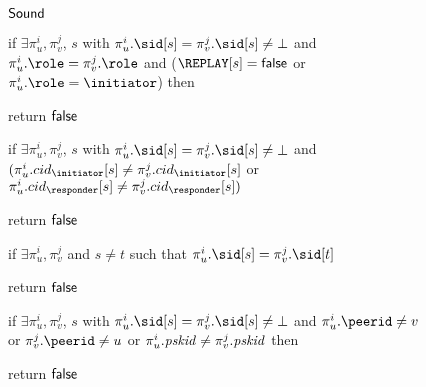 \begin{figure}[tp]
\begin{minipage}[t]{0.49\textwidth}
\begin{algorithm}{$\mathsf{Sound}$}
		\item if $\exists \pi_u^i, \pi_v^j$, $s$ with \newline
		\null\hindent 
		$\pi_u^i.\sid[s] = \pi_v^j.\sid[s] \neq \bot$ and \newline
		\null\hindent $\pi_u^i.\role = \pi_v^j.\role$ and \newline
		\null\hindent ($\REPLAY[s] = \false$ or $\pi_u^i.\role = \initiator$) then 
		\item \hindent return $\mathsf{false}$
		\newline {}
		
		\item if $\exists \pi_u^i, \pi_v^j$, $s$ with \newline
		\null \hindent
		$\pi_u^i.\sid[s] = \pi_v^j.\sid[s] \neq \bot$ and \newline $(\pi_u^i.\initcid[s] \neq \pi_v^j.\initcid[s]$ or $\pi_u^i.\respcid[s] \neq \pi_v^j.\respcid[s])$
		\item \hindent return $\mathsf{false}$
		\newline {}
		
		if $\exists \pi_u^i, \pi_v^j$ and $s \neq t$ such that
		\newline
		\null \hindent $\pi_u^i.\sid[s] = \pi_v^j.\sid[t]$
		\item \hindent return $\mathsf{false}$
		\newline {}
		
		\item if $\exists \pi_u^i, \pi_v^j$, $s$ with \newline
		\null\hindent $\pi_u^i.\sid[s] = \pi_v^j.\sid[s]\neq \bot $ \newline
		\null\hindent and $\pi_u^i.\peerid \neq v$ \newline
		\null\hindent or $\pi_v^j.\peerid \neq u$ or $\pi_u^i.\mathit{pskid} \neq \pi_v^j.\mathit{pskid}$ then
		\newline  {}
		\item \hindent return $\mathsf{false}$
		

\end{algorithm}
\end{minipage}
\end{figure}
